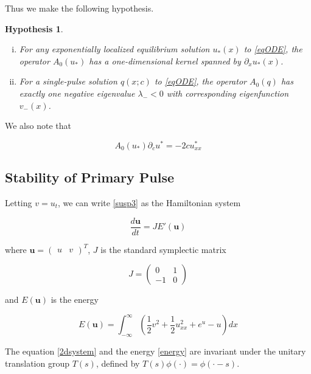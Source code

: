 \documentclass[12pt]{article}
\newtheorem{hypothesis}{Hypothesis}
\begin{document}
Thus we make the following hypothesis.

\begin{hypothesis}\label{A0neg}
\begin{enumerate}[(i)]
\item For any exponentially localized equilibrium solution $u_*(x)$ to \eqref{eqODE}, the operator $A_0(u_*)$ has a one-dimensional kernel spanned by $\partial_x u_*(x)$. 
\item For a single-pulse solution $q(x; c)$ to \eqref{eqODE}, the operator $A_0(q)$ has exactly one negative eigenvalue $\lambda_- < 0$ with corresponding eigenfunction $v_-(x)$.
\end{enumerate}
\end{hypothesis}

We also note that 

\begin{equation}\label{uc}
A_0(u_*) \partial_c u^* = -2 c u^*_{xx}
\end{equation}

\subsection{Stability of Primary Pulse}

Letting $v = u_t$, we can write \eqref{susp3} as the Hamiltonian system

\begin{equation}\label{2dsystem}
\frac{d \textbf{u} }{dt} = J E'(\textbf{u})
\end{equation}

where $\textbf{u} = \begin{pmatrix}u&v\end{pmatrix}^T$, $J$ is the standard symplectic matrix

\begin{equation*}
J = \begin{pmatrix}0 & 1 \\ -1 & 0 \end{pmatrix}
\end{equation*}

and $E(\textbf{u})$ is the energy

\begin{equation}\label{energy}
E(\textbf{u}) = \int_{-\infty}^\infty \left(\frac{1}{2} v^2 + \frac{1}{2}u_{xx}^2 + e^{u} - u \right)dx
\end{equation}

The equation \eqref{2dsystem} and the energy \eqref{energy} are invariant under the unitary translation group $T(s)$, defined by $T(s)\phi(\cdot) = \phi(\cdot - s)$. \\
\end{document}
